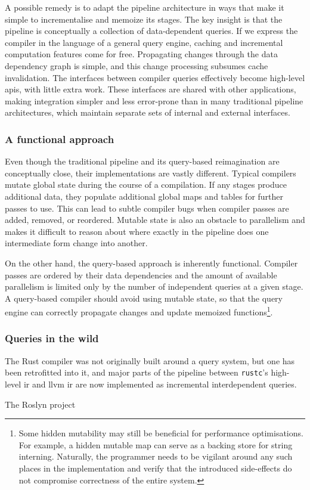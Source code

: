 A possible remedy is to adapt the pipeline architecture in ways that make it
simple to incrementalise and memoize its stages. The key insight is that the
pipeline is conceptually a collection of data-dependent queries. If we express
the compiler in the language of a general query engine, caching and incremental
computation features come for free. Propagating changes through the data
dependency graph is simple, and this change processing subsumes cache
invalidation. The interfaces between compiler queries effectively become
high-level \acrshort{api}s, with little extra work. These interfaces are shared
with other applications, making integration simpler and less error-prone than in
many traditional pipeline architectures, which maintain separate sets of
internal and external interfaces.

\subsubsection*{A functional approach}

Even though the traditional pipeline and its query-based reimagination are
conceptually close, their implementations are vastly different. Typical
compilers mutate global state during the course of a compilation. If any stages
produce additional data, they populate additional global maps and tables for
further passes to use. This can lead to subtle compiler bugs when compiler
passes are added, removed, or reordered. Mutable state is also an obstacle to
parallelism and makes it difficult to reason about where exactly in the pipeline
does one intermediate form change into another.

On the other hand, the query-based approach is inherently functional. Compiler
passes are ordered by their data dependencies and the amount of available
parallelism is limited only by the number of independent queries at a given
stage. A query-based compiler should avoid using mutable state, so that the
query engine can correctly propagate changes and update memoized
functions\footnote{Some hidden mutability may still be beneficial for
performance optimisations. For example, a hidden mutable map can serve as a
backing store for string interning. Naturally, the programmer needs to be
vigilant around any such places in the implementation and verify that the
introduced side-effects do not compromise correctness of the entire system.}.

\subsubsection*{Queries in the wild}

The Rust compiler was not originally built around a query system, but one has
been retrofitted into it, and major parts of the pipeline between
\texttt{rustc}'s high-level \acrshort{ir} and \acrshort{llvm} \acrshort{ir} are
now implemented as incremental interdependent queries.

The Roslyn project

